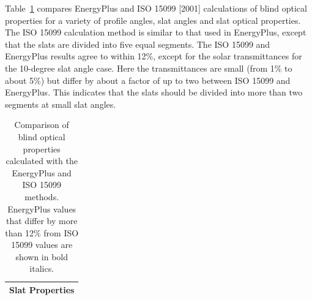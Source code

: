 Table~\ref{table:comparison-of-blind-optical-properties} compares EnergyPlus and ISO 15099 {[}2001{]} calculations of blind optical properties for a variety of profile angles, slat angles and slat optical properties. The ISO 15099 calculation method is similar to that used in EnergyPlus, except that the slats are divided into five equal segments. The ISO 15099 and EnergyPlus results agree to within 12\%, except for the solar transmittances for the 10-degree slat angle case. Here the transmittances are small (from 1\% to about 5\%) but differ by about a factor of up to two between ISO 15099 and EnergyPlus. This indicates that the slats should be divided into more than two segments at small slat angles.

\begin{longtable}[c]{p{1.0in}p{0.4in}p{0.4in}p{0.4in}p{0.4in}p{0.4in}p{0.4in}p{0.4in}p{0.4in}p{0.4in}p{0.4in}}
\caption{Comparison of blind optical properties calculated with the EnergyPlus and ISO 15099 methods. EnergyPlus values that differ by more than 12\% from ISO 15099 values are shown in bold italics. \label{table:comparison-of-blind-optical-properties}} \tabularnewline
\toprule
\multicolumn{11}{l}{\textbf{Slat Properties}} \tabularnewline
\midrule
\endfirsthead


\end{longtable}
